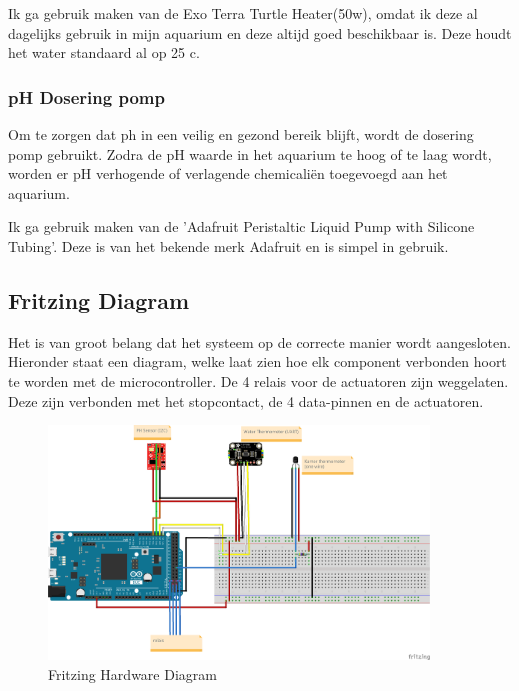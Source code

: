 \documentclass[a4paper]{report}
\begin{document}
Ik ga gebruik maken van de Exo Terra Turtle Heater(50w), omdat ik deze al dagelijks gebruik in mijn aquarium en deze altijd goed beschikbaar is.
Deze houdt het water standaard al op 25 \textdegree c. 

\subsubsection{pH Dosering pomp}
Om te zorgen dat ph in een veilig en gezond bereik blijft, wordt de dosering pomp gebruikt. 
Zodra de pH waarde in het aquarium te hoog of te laag wordt, worden er pH verhogende of verlagende chemicaliën toegevoegd aan het aquarium.

Ik ga gebruik maken van de 'Adafruit Peristaltic Liquid Pump with Silicone Tubing'. Deze is van het bekende merk Adafruit en is simpel in gebruik.


\subsection{Fritzing Diagram}
Het is van groot belang dat het systeem op de correcte manier wordt aangesloten. Hieronder staat een diagram, welke laat zien hoe elk component verbonden hoort te worden met de microcontroller.
De 4 relais voor de actuatoren zijn weggelaten. Deze zijn verbonden met het stopcontact, de 4 data-pinnen en de actuatoren.
\begin{figure}[h]
  \centering
  \includegraphics[width=0.9\textwidth]{Images/hardware_sketch_fritzing.png}
  \caption{Fritzing Hardware Diagram}
  \label{fig:hardware_sketch_fritzing}
\end{figure}
\end{document}
